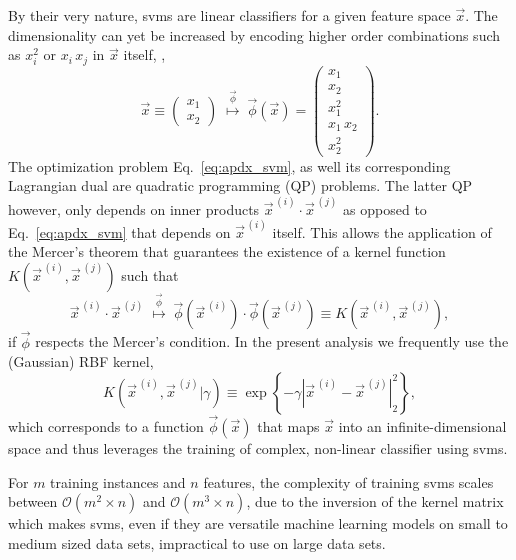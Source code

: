 By their very nature, \glspl{svm} are linear classifiers for a given feature space $\vec{x}$.
The dimensionality can yet be increased by encoding higher order combinations such as $x_i^2$ or $x_i \, x_j$ in $\vec{x}$ itself, \eg{},
$$\vec x \equiv \begin{pmatrix} x_1 \\ x_2 \end{pmatrix} \; \overset{\vec\phi}{\longmapsto} \; \vec\phi \left( \vec x \right) = \begin{pmatrix} x_1 \\ x_2 \\ x_1^2 \\ x_1 \, x_2 \\ x_2^2 \end{pmatrix}.$$
The optimization problem Eq.~\eqref{eq:apdx_svm}, as well its corresponding Lagrangian dual are quadratic programming (QP) problems.
The latter QP however, only depends on inner products $\vec{x}^{\,(i)} \cdot \vec{x}^{\,(j)}$ as opposed to Eq.~\eqref{eq:apdx_svm} that depends on $\vec{x}^{\,(i)}$ itself.
This allows the application of the Mercer's theorem that guarantees the existence of a kernel function $K\! \left( \vec{x}^{\,(i)}, \vec{x}^{\,(j)} \right)$ such that 
$$\vec{x}^{\,(i)} \cdot \vec{x}^{\,(j)} \; \overset{\vec \phi}{\longmapsto} \; \vec \phi\! \left( \vec{x}^{\,(i)} \right) \cdot \vec \phi\! \left( \vec{x}^{\,(j)} \right) \equiv K\! \left( \vec{x}^{\,(i)}, \vec{x}^{\,(j)} \right),$$
if $\vec\phi$ respects the Mercer's condition.
In the present analysis we frequently use the (Gaussian) RBF kernel,
$$K\! \left( \vec{x}^{\,(i)}, \vec{x}^{\,(j)} | \gamma \right) \equiv \exp \left\{ -\gamma \left| \vec{x}^{\,(i)} - \vec{x}^{\,(j)} \right|_2^2 \right\},$$
which corresponds to a function $\vec \phi(\vec x)$ that maps $\vec x$ into an infinite-dimensional space and thus leverages the training of complex, non-linear classifier using \glspl{svm}.

For $m$ training instances and $n$ features, the complexity of training \glspl{svm} scales between $\mathcal{O}(m^2 \times n)$ and $\mathcal{O}(m^3 \times n)$, due to the inversion of the kernel matrix which makes \glspl{svm}, even if they are versatile machine learning models on small to medium sized data sets, impractical to use on large data sets.
